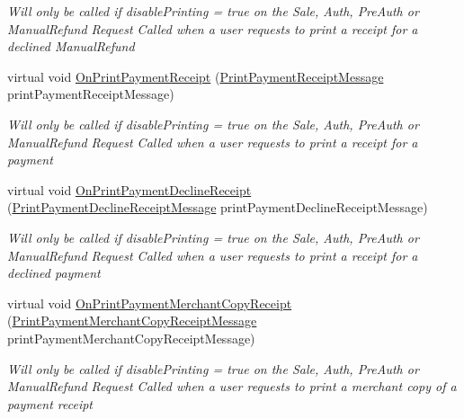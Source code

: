 \begin{DoxyCompactItemize}
\begin{DoxyCompactList}\small\item\em Will only be called if disable\+Printing = true on the Sale, Auth, Pre\+Auth or Manual\+Refund Request Called when a user requests to print a receipt for a declined Manual\+Refund \end{DoxyCompactList}\item 
virtual void \hyperlink{classcom_1_1clover_1_1remotepay_1_1sdk_1_1_default_clover_connector_listener_aeb819ef1568aac6bfdb54de3e8823685}{On\+Print\+Payment\+Receipt} (\hyperlink{classcom_1_1clover_1_1remotepay_1_1sdk_1_1_print_payment_receipt_message}{Print\+Payment\+Receipt\+Message} print\+Payment\+Receipt\+Message)
\begin{DoxyCompactList}\small\item\em Will only be called if disable\+Printing = true on the Sale, Auth, Pre\+Auth or Manual\+Refund Request Called when a user requests to print a receipt for a payment \end{DoxyCompactList}\item 
virtual void \hyperlink{classcom_1_1clover_1_1remotepay_1_1sdk_1_1_default_clover_connector_listener_a5c37faa1b2fd5dfc6c5ea0aa85c32d50}{On\+Print\+Payment\+Decline\+Receipt} (\hyperlink{classcom_1_1clover_1_1remotepay_1_1sdk_1_1_print_payment_decline_receipt_message}{Print\+Payment\+Decline\+Receipt\+Message} print\+Payment\+Decline\+Receipt\+Message)
\begin{DoxyCompactList}\small\item\em Will only be called if disable\+Printing = true on the Sale, Auth, Pre\+Auth or Manual\+Refund Request Called when a user requests to print a receipt for a declined payment \end{DoxyCompactList}\item 
virtual void \hyperlink{classcom_1_1clover_1_1remotepay_1_1sdk_1_1_default_clover_connector_listener_a308bf50f9fbf9bb6ec0955adde11a429}{On\+Print\+Payment\+Merchant\+Copy\+Receipt} (\hyperlink{classcom_1_1clover_1_1remotepay_1_1sdk_1_1_print_payment_merchant_copy_receipt_message}{Print\+Payment\+Merchant\+Copy\+Receipt\+Message} print\+Payment\+Merchant\+Copy\+Receipt\+Message)
\begin{DoxyCompactList}\small\item\em Will only be called if disable\+Printing = true on the Sale, Auth, Pre\+Auth or Manual\+Refund Request Called when a user requests to print a merchant copy of a payment receipt \end{DoxyCompactList}\item 

\end{DoxyCompactItemize}
